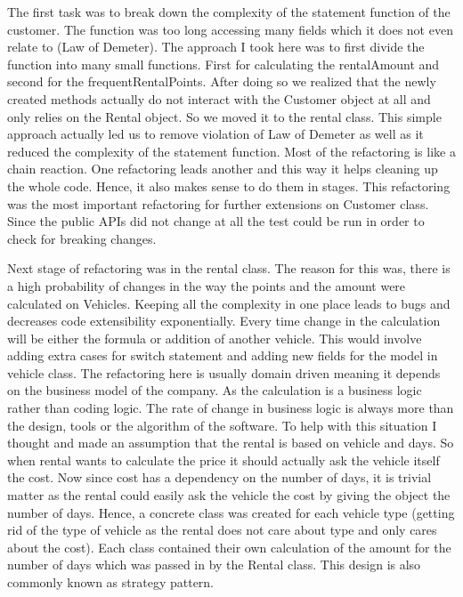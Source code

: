 The first task was to break down the complexity of the statement function of the customer. The function was too long accessing many fields which it does not even relate to (Law of Demeter). The approach I took here was to first divide the function into many small functions. First for calculating the rentalAmount and second for the frequentRentalPoints. After doing so we realized that the newly created methods actually do not interact with the Customer object at all and only relies on the Rental object. So we moved it to the rental class. This simple approach actually led us to remove violation of Law of Demeter as well as it reduced the complexity of the statement function. Most of the refactoring is like a chain reaction. One refactoring leads another and this way it helps cleaning up the whole code. Hence, it also makes sense to do them in stages. This refactoring was the most important refactoring for further extensions on Customer class. Since the public APIs did not change at all the test could be run in order to check for breaking changes.

Next stage of refactoring was in the rental class. The reason for this was, there is a high probability of changes in the way the points and the amount were calculated on Vehicles. Keeping all the complexity in one place leads to bugs and decreases code extensibility exponentially. Every time change in the calculation will be either the formula or addition of another vehicle. This would involve adding extra cases for switch statement and adding new fields for the model in vehicle class. The refactoring here is usually domain driven meaning it depends on the business model of the company. As the calculation is a business logic rather than coding logic. The rate of change in business logic is always more than the design, tools or the algorithm of the software. To help with this situation I thought and made an assumption that the rental is based on vehicle and days. So when rental wants to calculate the price it should actually ask the vehicle itself the cost. Now since cost has a dependency on the number of days, it is trivial matter as the rental could easily ask the vehicle the cost by giving the object the number of days. Hence, a concrete class was created for each vehicle type (getting rid of the type of vehicle as the rental does not care about type and only cares about the cost). Each class contained their own calculation of the amount for the number of days which was passed in by the Rental class. This design is also commonly known as strategy pattern.

